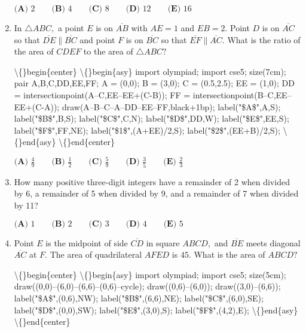 \documentclass{article}
\begin{document}
\begin{enumerate}[label=\arabic*., itemsep=0.5em]
\(\textbf{(A) } 2 \qquad \textbf{(B) } 4 \qquad \textbf{(C) } 8 \qquad \textbf{(D) } 12 \qquad \textbf{(E) } 16\)\par \vspace{0.5em}\item In \(\triangle ABC,\) a point \(E\) is on \(\overline{AB}\) with \(AE=1\) and \(EB=2.\) Point \(D\) is on \(\overline{AC}\) so that \(\overline{DE} \parallel \overline{BC}\) and point \(F\) is on \(\overline{BC}\) so that \(\overline{EF} \parallel \overline{AC}.\) What is the ratio of the area of \(CDEF\) to the area of \(\triangle ABC?\)


\textbackslash\{\}begin\{center\}
\textbackslash\{\}begin\{asy\}
import olympiad;
import cse5;
size(7cm);
pair A,B,C,DD,EE,FF;
A = (0,0); B = (3,0); C = (0.5,2.5);
EE = (1,0);
DD = intersectionpoint(A--C,EE--EE+(C-B));
FF = intersectionpoint(B--C,EE--EE+(C-A));
draw(A--B--C--A--DD--EE--FF,black+1bp);
label("\$A\$",A,S); label("\$B\$",B,S); label("\$C\$",C,N);
label("\$D\$",DD,W); label("\$E\$",EE,S); label("\$F\$",FF,NE);
label("\$1\$",(A+EE)/2,S); label("\$2\$",(EE+B)/2,S);
\textbackslash\{\}end\{asy\}
\textbackslash\{\}end\{center\}


\(\textbf{(A) } \frac{4}{9} \qquad \textbf{(B) } \frac{1}{2} \qquad \textbf{(C) } \frac{5}{9} \qquad \textbf{(D) } \frac{3}{5} \qquad \textbf{(E) } \frac{2}{3}\)\par \vspace{0.5em}\item How many positive three-digit integers have a remainder of 2 when divided by 6, a remainder of 5 when divided by 9, and a remainder of 7 when divided by 11?

\(\textbf{(A) }1\qquad\textbf{(B) }2\qquad\textbf{(C) }3\qquad\textbf{(D) }4\qquad \textbf{(E) }5\)\par \vspace{0.5em}\item Point \(E\) is the midpoint of side \(\overline{CD}\) in square \(ABCD,\) and \(\overline{BE}\) meets diagonal \(\overline{AC}\) at \(F.\) The area of quadrilateral \(AFED\) is \(45.\) What is the area of \(ABCD?\)


\textbackslash\{\}begin\{center\}
\textbackslash\{\}begin\{asy\}
import olympiad;
import cse5;
size(5cm);
draw((0,0)--(6,0)--(6,6)--(0,6)--cycle);
draw((0,6)--(6,0)); draw((3,0)--(6,6));
label("\$A\$",(0,6),NW);
label("\$B\$",(6,6),NE);
label("\$C\$",(6,0),SE);
label("\$D\$",(0,0),SW);
label("\$E\$",(3,0),S);
label("\$F\$",(4,2),E);
\textbackslash\{\}end\{asy\}
\textbackslash\{\}end\{center\}



\end{enumerate}
\end{document}
